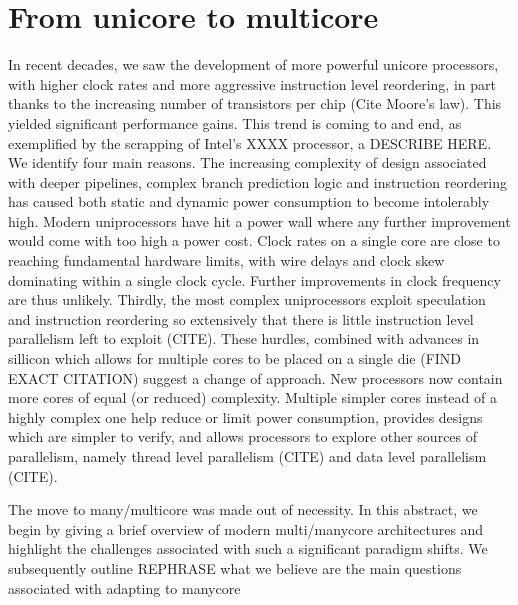 \section{From unicore to multicore}

In recent decades, we saw the development of more powerful
unicore processors, with higher clock rates and more
aggressive instruction level reordering, in part
thanks to the increasing number of transistors per chip
(Cite Moore's law). This yielded
significant performance gains. This trend is coming to and end,
 as exemplified by the scrapping of Intel's
XXXX processor, a DESCRIBE HERE. We identify
four main reasons. The increasing complexity
of design associated with deeper pipelines,
complex branch prediction logic and instruction
reordering has caused both static and dynamic power consumption
to become intolerably high. Modern uniprocessors have hit
a power wall where any further improvement would come
with too high a power cost. Clock rates on
a single core are close to reaching fundamental hardware limits,
with wire delays and clock skew dominating within a single clock cycle.
Further improvements in clock frequency are thus unlikely. Thirdly, the most
complex uniprocessors exploit speculation and instruction reordering so
extensively that there is little instruction level parallelism left to
exploit (CITE). These hurdles, combined with advances in sillicon which allows
for multiple cores to be placed on a single die (FIND EXACT CITATION)
suggest a change of approach. New processors now contain
more cores of equal (or reduced) complexity. Multiple simpler cores
instead of a highly complex one help reduce or limit power consumption,
provides designs which are simpler to verify, and allows processors
to explore other sources of parallelism, namely thread level parallelism (CITE)
and data level parallelism (CITE).

The move to many/multicore was made out of necessity. In this abstract, we begin
by giving a brief overview of modern multi/manycore architectures and highlight
the challenges associated with such a significant paradigm shifts. We subsequently
outline REPHRASE what we believe are the main questions associated with 
adapting to manycore


